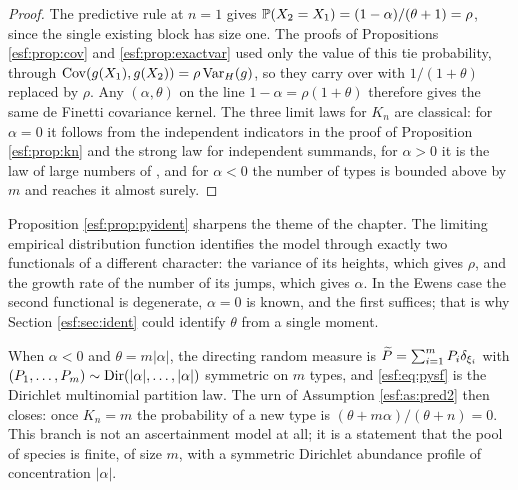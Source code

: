 \begin{proof}
The predictive rule at $n=1$ gives $\mathbb{P}(X_2 = X_1) = (1-\alpha)/(\theta+1) = \rho$,
since the single existing block has size one. The proofs of Propositions
\ref{esf:prop:cov} and \ref{esf:prop:exactvar} used only the value of this tie probability,
through $\operatorname{Cov}(g(X_1),g(X_2)) = \rho \operatorname{Var}_H(g)$, so they carry over with
$1/(1+\theta)$ replaced by $\rho$. Any $(\alpha,\theta)$ on the line $1 - \alpha =
\rho(1+\theta)$ therefore gives the same de Finetti covariance kernel. The three limit
laws for $K_n$ are classical: for $\alpha = 0$ it follows from the independent indicators in the proof of Proposition \ref{esf:prop:kn} and the strong law for independent summands, for
$\alpha>0$ it is the law of large numbers of \citet{esf:pitmanyor1997}, and for $\alpha<0$ the number of
types is bounded above by $m$ and reaches it almost surely.
\end{proof}

Proposition \ref{esf:prop:pyident} sharpens the theme of the chapter. The limiting empirical
distribution function identifies the model through exactly two functionals of a
different character: the variance of its heights, which gives $\rho$, and the growth
rate of the number of its jumps, which gives $\alpha$. In the Ewens case the second
functional is degenerate, $\alpha = 0$ is known, and the first suffices; that is why
Section \ref{esf:sec:ident} could identify $\theta$ from a single moment.

\begin{remark}
\label{esf:rem:finite}
When $\alpha < 0$ and $\theta = m|\alpha|$, the directing random measure is
$\widetilde{P} = \sum_{i=1}^{m} P_i \delta_{\xi_i}$ with
$(P_1,\dots,P_m) \sim \operatorname{Dir}(|\alpha|,\dots,|\alpha|)$ symmetric on $m$ types, and
\eqref{esf:eq:pysf} is the Dirichlet multinomial partition law. The urn of Assumption
\ref{esf:as:pred2} then closes: once $K_n = m$ the probability of a new type is
$(\theta+m\alpha)/(\theta+n) = 0$. This branch is not an ascertainment model at all;
it is a statement that the pool of species is finite, of size $m$, with a symmetric
Dirichlet abundance profile of concentration $|\alpha|$.
\end{remark}

